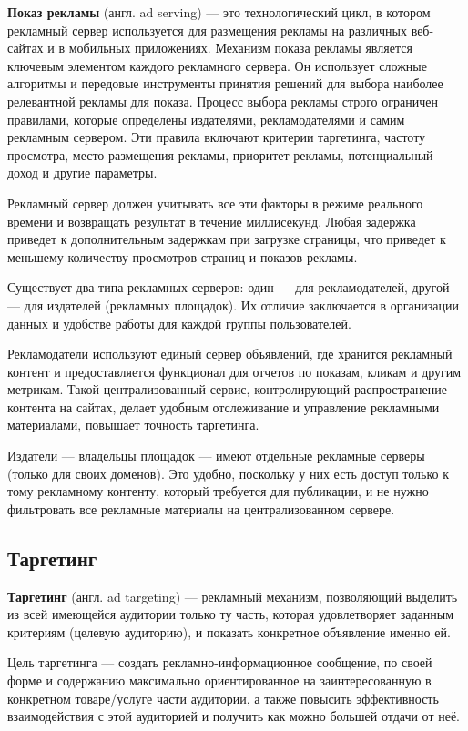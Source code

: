 \documentclass[times]{itmo-student-thesis}
\begin{document}
\textbf{Показ рекламы} (англ. ad serving)\label{ad-serving} — это технологический цикл, в котором рекламный сервер используется для размещения рекламы на различных веб-сайтах и в мобильных приложениях. Механизм показа рекламы является ключевым элементом каждого рекламного сервера. Он использует сложные алгоритмы и передовые инструменты принятия решений для выбора наиболее релевантной рекламы для показа. Процесс выбора рекламы строго ограничен правилами, которые определены издателями, рекламодателями и самим рекламным сервером. Эти правила включают критерии таргетинга, частоту просмотра, место размещения рекламы, приоритет рекламы, потенциальный доход и другие параметры. 

Рекламный сервер должен учитывать все эти факторы в режиме реального времени и возвращать результат в течение миллисекунд. Любая задержка приведет к дополнительным задержкам при загрузке страницы, что приведет к меньшему количеству просмотров страниц  и показов рекламы.

Существует два типа рекламных серверов: один — для рекламодателей, другой — для издателей (рекламных площадок). Их отличие заключается в организации данных и удобстве работы для каждой группы пользователей.

Рекламодатели используют единый сервер объявлений, где хранится рекламный контент и предоставляется функционал для отчетов по показам, кликам и другим метрикам. Такой централизованный сервис, контролирующий распространение контента на сайтах, делает удобным отслеживание и управление рекламными материалами, повышает точность таргетинга.

Издатели — владельцы площадок — имеют отдельные рекламные серверы (только для своих доменов). Это удобно, поскольку у них есть доступ только к тому рекламному контенту, который требуется для публикации, и не нужно фильтровать все рекламные материалы на централизованном сервере.

\subsection{Таргетинг}

\textbf{Таргетинг} (англ. ad targeting)\label{targeting} — рекламный механизм, позволяющий выделить из всей имеющейся аудитории только ту часть, которая удовлетворяет заданным критериям (целевую аудиторию), и показать конкретное объявление именно ей.

Цель таргетинга — создать рекламно-информационное сообщение, по своей форме и содержанию максимально ориентированное на заинтересованную в конкретном товаре/услуге части аудитории, а также повысить эффективность взаимодействия с этой аудиторией и получить как можно большей отдачи от неё.
\end{document}
